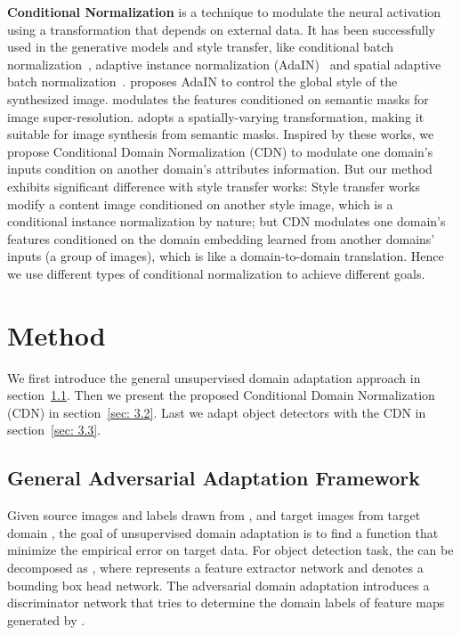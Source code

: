 \documentclass[runningheads]{llncs}
\begin{document}
\noindent \textbf{Conditional Normalization}
is a technique to modulate the neural activation using a transformation that depends on external data.
It has been successfully used in the generative models and style transfer, like conditional batch normalization~\cite{dumoulin2016learned}, adaptive instance normalization (AdaIN)~\cite{huang2017arbitrary} and spatial adaptive batch normalization~\cite{park2019semantic}.
\cite{huang2017arbitrary} proposes AdaIN to control the global style of the synthesized image.
\cite{wang2018recovering} modulates the features conditioned on semantic masks for image  super-resolution.
\cite{park2019semantic} adopts a spatially-varying transformation, making it suitable for image synthesis from semantic masks.
Inspired by these works, we propose Conditional Domain Normalization (CDN) to modulate one domain's inputs condition on another domain's attributes information.
But our method exhibits significant difference with style transfer works:
Style transfer works modify a content image conditioned on another style image, which is a conditional instance normalization by nature;
but CDN  modulates one domain's features conditioned on the domain embedding learned from another domains' inputs (a group of images), which is like a domain-to-domain translation.
Hence we use different types of conditional normalization to achieve different goals.



\section{Method}
We first introduce the general unsupervised domain adaptation approach in section~\ref{sec: 3.1}.
Then we present the proposed Conditional Domain Normalization (CDN) in section~\ref{sec: 3.2}.
Last we adapt object detectors with the CDN in section~\ref{sec: 3.3}.


\subsection{General Adversarial Adaptation Framework} \label{sec: 3.1}
Given source images and labels  drawn from , and target images  from target domain ,
the goal of unsupervised domain adaptation is to find a function  that minimize the empirical error on target data.
For object detection task, the  can be decomposed as , where  represents a feature extractor network and  denotes a bounding box head network.
The adversarial domain adaptation introduces a discriminator network  that tries to determine the domain labels of feature maps generated by .
\end{document}

